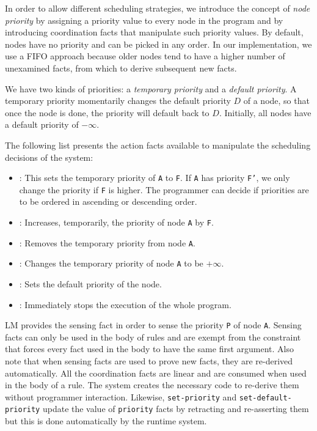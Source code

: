 
In order to allow different scheduling strategies, we introduce the concept of
\emph{node priority} by assigning a priority value to every node in the program
and by introducing coordination facts that manipulate such priority values.  By
default, nodes have no priority and can be picked in any order. In our
implementation, we use a FIFO approach because older nodes tend to have a higher
number of unexamined facts, from which to derive subsequent new facts.

We have two kinds of priorities: a \emph{temporary priority} and a \emph{default
   priority}. A temporary priority momentarily changes the default priority $D$
of a node, so that once the node is done, the priority will default back to $D$.
Initially, all nodes have a default priority of $-\infty$.

The following list presents the action facts available to manipulate the
scheduling decisions of the system:

\begin{itemize}
   \item {}: This sets the
   temporary priority of \texttt{A} to \texttt{F}. If \texttt{A} has priority
   \texttt{F'}, we only change the priority if \texttt{F} is higher. The programmer
   can decide if priorities are to be ordered in ascending or descending order.
   \item {}: Increases,
   temporarily, the priority of node \texttt{A} by \texttt{F}.
   \item {}: Removes the temporary priority from node
   \texttt{A}.
   \item {}: Changes the temporary priority of node
   \texttt{A} to be $+\infty$.
   \item {}: Sets the default
   priority of the node.
   \item {}: Immediately stops the execution of the whole program.
\end{itemize}

LM provides the sensing fact  in order to sense
the priority \texttt{P} of node \texttt{A}. Sensing facts can only be used in
the body of rules and are exempt from the constraint that forces every fact used
in the body to have the same first argument. Also note that when sensing facts
are used to prove new facts, they are re-derived automatically. All the
coordination facts are linear and are consumed when used in the body of a rule.
The system creates the necessary code to re-derive them without programmer
interaction. Likewise, \texttt{set-priority} and \texttt{set-default-priority}
update the value of \texttt{priority} facts by retracting and re-asserting them
but this is done automatically by the runtime system.


